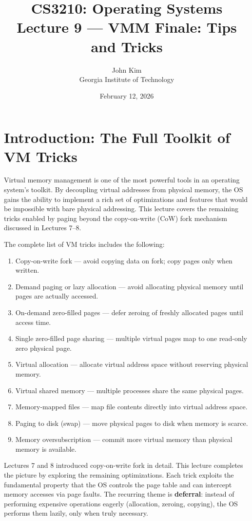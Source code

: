 \documentclass[11pt]{article}
\title{\textbf{CS3210: Operating Systems} \\ Lecture 9 --- VMM Finale: Tips and Tricks}
\author{John Kim \\ Georgia Institute of Technology}
\date{February 12, 2026}
\begin{document}
\maketitle
\tableofcontents
\newpage

\section{Introduction: The Full Toolkit of VM Tricks}

Virtual memory management is one of the most powerful tools in an operating system's toolkit. By decoupling virtual addresses from physical memory, the OS gains the ability to implement a rich set of optimizations and features that would be impossible with bare physical addressing. This lecture covers the remaining tricks enabled by paging beyond the copy-on-write (CoW) fork mechanism discussed in Lectures 7--8.

The complete list of VM tricks includes the following:

\begin{enumerate}
    \item Copy-on-write fork — avoid copying data on fork; copy pages only when written.
    \item Demand paging or lazy allocation — avoid allocating physical memory until pages are actually accessed.
    \item On-demand zero-filled pages — defer zeroing of freshly allocated pages until access time.
    \item Single zero-filled page sharing — multiple virtual pages map to one read-only zero physical page.
    \item Virtual allocation — allocate virtual address space without reserving physical memory.
    \item Virtual shared memory — multiple processes share the same physical pages.
    \item Memory-mapped files — map file contents directly into virtual address space.
    \item Paging to disk (swap) — move physical pages to disk when memory is scarce.
    \item Memory oversubscription — commit more virtual memory than physical memory is available.
\end{enumerate}

Lectures 7 and 8 introduced copy-on-write fork in detail. This lecture completes the picture by exploring the remaining optimizations. Each trick exploits the fundamental property that the OS controls the page table and can intercept memory accesses via page faults. The recurring theme is \textbf{deferral}: instead of performing expensive operations eagerly (allocation, zeroing, copying), the OS performs them lazily, only when truly necessary.
\end{document}
